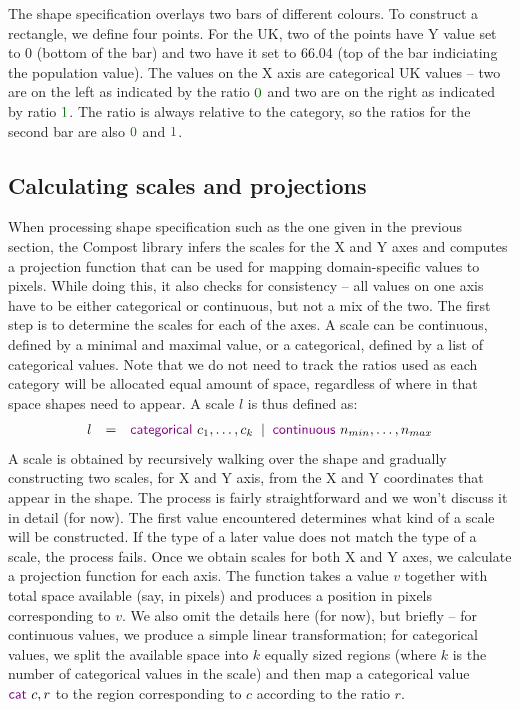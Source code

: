 \documentclass{jfp}
\newcommand{\lsep}{\;\;|\;\;}
\newcommand{\num}[1]{\textcolor{numclr}{#1}}
\newcommand{\strf}[1]{\textnormal{\textcolor{strclr}{\sffamily #1}}}
\newcommand{\kvd}[1]{\textnormal{\textcolor{kvdclr}{\sffamily #1}}}
\begin{document}
%
The shape specification overlays two bars of different colours. To construct a rectangle, we
define four points. For the UK, two of the points have Y value set to 0 (bottom of the bar) and
two have it set to 66.04 (top of the bar indiciating the population value). The values on the X
axis are categorical \strf{UK} values -- two are on the left as indicated by the ratio $\num{0}$
and two are on the right as indicated by ratio $\num{1}$. The ratio is always relative to the
category, so the ratios for the second bar are also $\num{0}$ and $\num{1}$.
\subsection*{Calculating scales and projections}
When processing shape specification such as the one given in the previous section, the Compost
library infers the scales for the X and Y axes and computes a projection function that can be
used for mapping domain-specific values to pixels. While doing this, it also checks for consistency --
all values on one axis have to be either categorical or continuous, but not a mix of the two.
The first step is to determine the scales for each of the axes. A scale can be continuous,
defined by a minimal and maximal value, or a categorical, defined by a list of categorical values.
Note that we do not need to track the ratios used as each category
will be allocated equal amount of space, regardless of where in that space shapes need to
appear. A scale $l$ is thus defined as:
%
\begin{equation*}
\begin{array}{rcl}
l & = & \kvd{categorical}~c_1, \ldots, c_k \lsep \kvd{continuous}~n_{min}, \ldots, n_{max}
\end{array}
\end{equation*}
%
A scale is obtained by recursively walking over the shape and gradually constructing two scales,
for X and Y axis, from the X and Y coordinates that appear in the shape. The process is fairly
straightforward and we won't discuss it in detail (for now). The first value encountered determines
what kind of a scale will be constructed. If the type of a later value does not match the type of a
scale, the process fails.
Once we obtain scales for both X and Y axes, we calculate a projection function for each axis.
The function takes a value $v$ together with total space available (say, in pixels) and produces
a position in pixels corresponding to $v$. We also omit the details here (for now), but briefly --
for continuous values, we produce a simple linear transformation; for categorical values, we split
the available space into $k$ equally sized regions (where $k$ is the number of categorical values
in the scale) and then map a categorical value $\kvd{cat}~c, r$ to the region corresponding to $c$
according to the ratio $r$.
\end{document}

